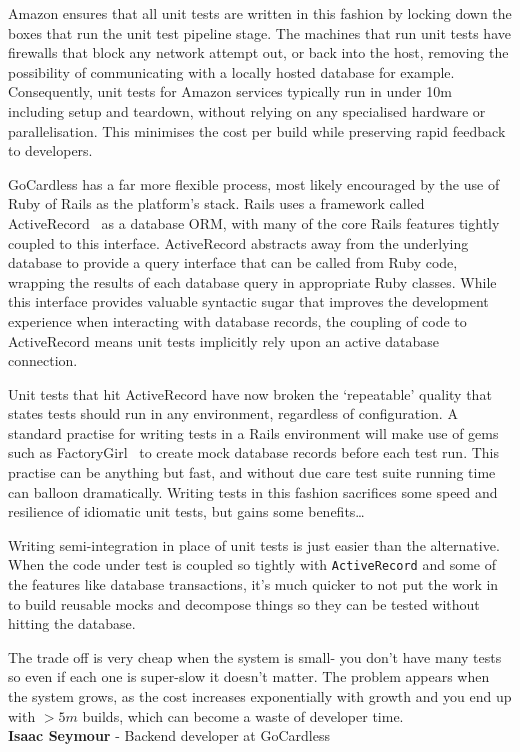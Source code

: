\documentclass[11pt]{article}
\begin{document}
Amazon ensures that all unit tests are written in this fashion by locking down
the boxes that run the unit test pipeline stage. The machines that run unit
tests have firewalls that block any network attempt out, or back into the host,
removing the possibility of communicating with a locally hosted database for
example. Consequently, unit tests for Amazon services typically run in under 10m
including setup and teardown, without relying on any specialised hardware or
parallelisation. This minimises the cost per build while preserving rapid
feedback to developers.

GoCardless has a far more flexible process, most likely encouraged by the use of
Ruby of Rails as the platform's stack. Rails uses a framework called
ActiveRecord~\cite{activeRecord} as a database ORM, with many of the core Rails
features tightly coupled to this interface. ActiveRecord abstracts away from the
underlying database to provide a query interface that can be called from Ruby
code, wrapping the results of each database query in appropriate Ruby classes.
While this interface provides valuable syntactic sugar that improves the
development experience when interacting with database records, the coupling of
code to ActiveRecord means unit tests implicitly rely upon an active database
connection.

Unit tests that hit ActiveRecord have now broken the ‘repeatable' quality that
states tests should run in any environment, regardless of configuration. A
standard practise for writing tests in a Rails environment will make use of gems
such as FactoryGirl~\cite{factoryGirl} to create mock database records before
each test run. This practise can be anything but fast, and without due care test
suite running time can balloon dramatically. Writing tests in this fashion
sacrifices some speed and resilience of idiomatic unit tests, but gains some
benefits…

\begin{displayquote}

  Writing semi-integration in place of unit tests is just easier than the
  alternative. When the code under test is coupled so tightly with
  \texttt{ActiveRecord} and some of the features like database transactions,
  it's much quicker to not put the work in to build reusable mocks and decompose
  things so they can be tested without hitting the database.

  The trade off is very cheap when the system is small- you don't have many
  tests so even if each one is super-slow it doesn't matter. The problem appears
  when the system grows, as the cost increases exponentially with growth and you
  end up with $>5m$ builds, which can become a waste of developer time. \\

  \textbf{Isaac Seymour} - Backend developer at GoCardless

\end{displayquote}
\end{document}
